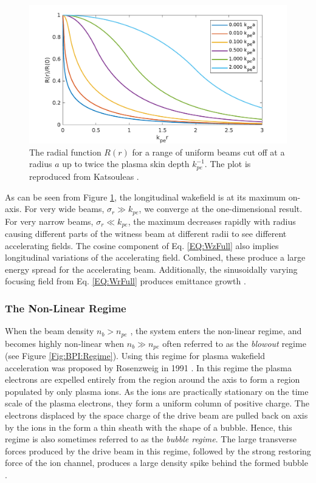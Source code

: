 \begin{figure}[hbt]
    \centering
    \includegraphics[width=0.8125\linewidth,trim={0mm 0mm 0mm 0mm},clip]{figures/RepKatsouleas1987}
    \caption{\label{Fig:BPI:Kat87} The radial function $R(r)$ for a range of uniform beams cut off at a radius $a$ up to twice the plasma skin depth $k_{pe}^{-1}$. The plot is reproduced from Katsouleas \etal \cite{katsouleas:1987}.}
\end{figure}

As can be seen from Figure \ref{Fig:BPI:Kat87}, the longitudinal wakefield is at its maximum on-axis. For very wide beams, $\sigma_{r} \gg k_{pe}$, we converge at the one-dimensional result. For very narrow beams, $\sigma_{r} \ll k_{pe}$, the maximum decreases rapidly with radius causing different parts of the witness beam at different radii to see different accelerating fields. The cosine component of Eq. \ref{EQ:WzFull} also implies longitudinal variations of the accelerating field. Combined, these produce a large energy spread for the accelerating beam. Additionally, the sinusoidally varying focusing field from Eq. \ref{EQ:WrFull} produces emittance growth \cite{muggli:2017,katsouleas:1987}.

\subsubsection{The Non-Linear Regime}
\label{Int:BPI:NLin}

When the beam density $n_{b} > n_{pe}$ , the system enters the non-linear regime, and becomes highly non-linear when $n_{b} \gg n_{pe}$ \dash often referred to as the \textit{blowout} regime (see Figure \ref{Fig:BPI:Regime}). Using this regime for plasma wakefield acceleration was proposed by Rosenzweig \etal in 1991 \cite{rosenzweig:1991}. In this regime the plasma electrons are expelled entirely from the region around the axis to form a region populated by only plasma ions. As the ions are practically stationary on the time scale of the plasma electrons, they form a uniform column of positive charge. The electrons displaced by the space charge of the drive beam are pulled back on axis by the ions in the form a thin sheath with the shape of a bubble. Hence, this regime is also sometimes referred to as the \textit{bubble regime}. The large transverse forces produced by the drive beam in this regime, followed by the strong restoring force of the ion channel, produces a large density spike behind the formed bubble \cite{dawson:1959,rosenzweig:1991}.

